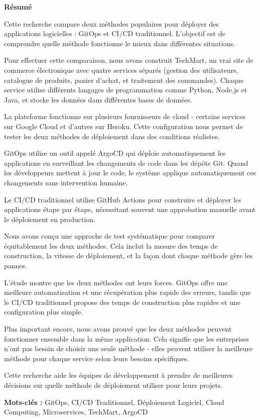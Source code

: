 \thispagestyle{empty}

\begin{center}
{\Large \textbf{Résumé}}
\end{center}

\vspace{1cm}

Cette recherche compare deux méthodes populaires pour déployer des applications logicielles : GitOps et CI/CD traditionnel. L'objectif est de comprendre quelle méthode fonctionne le mieux dans différentes situations.

Pour effectuer cette comparaison, nous avons construit TechMart, un vrai site de commerce électronique avec quatre services séparés (gestion des utilisateurs, catalogue de produits, panier d'achat, et traitement des commandes). Chaque service utilise différents langages de programmation comme Python, Node.js et Java, et stocke les données dans différentes bases de données.

La plateforme fonctionne sur plusieurs fournisseurs de cloud - certains services sur Google Cloud et d'autres sur Heroku. Cette configuration nous permet de tester les deux méthodes de déploiement dans des conditions réalistes.

GitOps utilise un outil appelé ArgoCD qui déploie automatiquement les applications en surveillant les changements de code dans les dépôts Git. Quand les développeurs mettent à jour le code, le système applique automatiquement ces changements sans intervention humaine.

Le CI/CD traditionnel utilise GitHub Actions pour construire et déployer les applications étape par étape, nécessitant souvent une approbation manuelle avant le déploiement en production.

Nous avons conçu une approche de test systématique pour comparer équitablement les deux méthodes. Cela inclut la mesure des temps de construction, la vitesse de déploiement, et la façon dont chaque méthode gère les pannes.

L'étude montre que les deux méthodes ont leurs forces. GitOps offre une meilleure automatisation et une récupération plus rapide des erreurs, tandis que le CI/CD traditionnel propose des temps de construction plus rapides et une configuration plus simple.

Plus important encore, nous avons prouvé que les deux méthodes peuvent fonctionner ensemble dans la même application. Cela signifie que les entreprises n'ont pas besoin de choisir une seule méthode - elles peuvent utiliser la meilleure méthode pour chaque service selon leurs besoins spécifiques.

Cette recherche aide les équipes de développement à prendre de meilleures décisions sur quelle méthode de déploiement utiliser pour leurs projets.

\textbf{Mots-clés :} GitOps, CI/CD Traditionnel, Déploiement Logiciel, Cloud Computing, Microservices, TechMart, ArgoCD

\newpage

\newpage

\newpage
